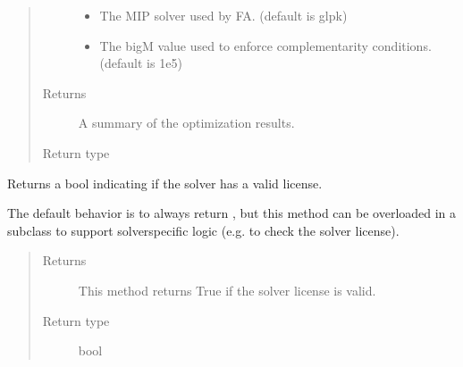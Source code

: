 \documentclass[letterpaper,10pt,english]{sphinxmanual}
\begin{document}
\begin{fulllineitems}
\begin{fulllineitems}
\begin{quote}
\begin{description}
\begin{itemize}
\item {} 
 \textendash{} The MIP solver used by FA.  (default is glpk)

\item {} 
 \textendash{} The big\sphinxhyphen{}M value used to enforce complementarity conditions.  (default is 1e5)

\end{itemize}

\item[{Returns}] \leavevmode
A summary of the optimization results.

\item[{Return type}] \leavevmode
{\hyperref[\detokenize{reference/solverapi:pao.common.solver.Results}]{}}

\end{description}\end{quote}

\end{fulllineitems}


\begin{fulllineitems}
\label{\detokenize{reference/mpr:pao.mpr.solvers.fa.LinearMultilevelSolver_FA.valid_license}}
Returns a bool indicating if the solver has a valid license.

The default behavior is to always return , but this method
can be overloaded in a subclass to support solver\sphinxhyphen{}specific logic
(e.g.  to check the solver license).
\begin{quote}\begin{description}
\item[{Returns}] \leavevmode
This method returns True if the solver license is valid.

\item[{Return type}] \leavevmode
bool

\end{description}\end{quote}

\end{fulllineitems}



\end{fulllineitems}
\end{document}
